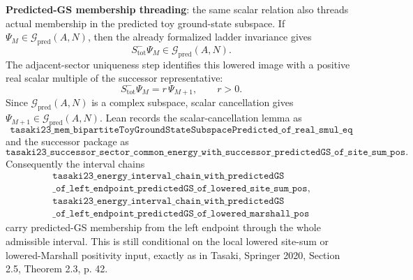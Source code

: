 \documentclass[a4paper,11pt]{article}
\begin{document}
\textbf{Predicted-GS membership threading}: the same scalar relation also
threads actual membership in the predicted toy ground-state subspace.  If
\(\Psi_M\in\mathcal G_{\mathrm{pred}}(A,N)\), then the already formalized
ladder invariance gives
\[
  S^-_{\mathrm{tot}}\Psi_M\in\mathcal G_{\mathrm{pred}}(A,N).
\]
The adjacent-sector uniqueness step identifies this lowered image with a
positive real scalar multiple of the successor representative:
\[
  S^-_{\mathrm{tot}}\Psi_M = r\,\Psi_{M+1},\qquad r>0.
\]
Since \(\mathcal G_{\mathrm{pred}}(A,N)\) is a complex subspace,
scalar cancellation gives \(\Psi_{M+1}\in
\mathcal G_{\mathrm{pred}}(A,N)\).  Lean records the scalar-cancellation
lemma as
\[
\texttt{tasaki23\_mem\_bipartiteToyGroundStateSubspacePredicted}
\texttt{\_of\_real\_smul\_eq}
\]
and the successor package as
\[
\texttt{tasaki23\_successor\_sector\_common\_energy}
\texttt{\_with\_successor\_predictedGS\_of\_site\_sum\_pos}.
\]
Consequently the interval chains
\[
\begin{gathered}
\texttt{tasaki23\_energy\_interval\_chain\_with\_predictedGS}\\
\texttt{\_of\_left\_endpoint\_predictedGS\_of\_lowered\_site\_sum\_pos},\\
\texttt{tasaki23\_energy\_interval\_chain\_with\_predictedGS}\\
\texttt{\_of\_left\_endpoint\_predictedGS\_of\_lowered\_marshall\_pos}
\end{gathered}
\]
carry predicted-GS membership from the left endpoint through the whole
admissible interval.  This is still conditional on the local lowered
site-sum or lowered-Marshall positivity input, exactly as in Tasaki,
Springer 2020, Section 2.5, Theorem 2.3, p. 42.
\end{document}
